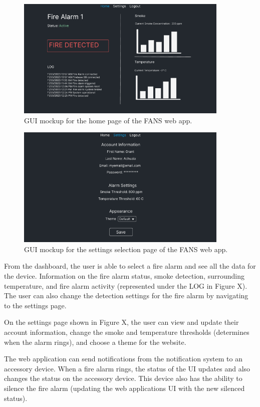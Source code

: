 \begin{figure}[H]
    \centering
    \includegraphics[width=4in]{../assets/HomePage.png}
    \caption{GUI mockup for the home page of the FANS web app.}
\end{figure}

\begin{figure}[H]
    \centering
    \includegraphics[width=4in]{../assets/SettingsPage.png}
    \caption{GUI mockup for the settings selection page of the FANS web app.}
\end{figure}

From the dashboard, the user is able to select a fire alarm and see all the data for the device. Information on the
fire alarm status, smoke detection, surrounding temperature, and fire alarm activity (represented under the LOG in
Figure X). The user can also change the detection settings for the fire alarm by navigating to the settings page.

On the settings page shown in Figure X, the user can view and update their account information, change the smoke and
temperature thresholds (determines when the alarm rings), and choose a theme for the website.

The web application can send notifications from the notification system to an accessory device. When a fire alarm
rings, the status of the UI updates and also changes the status on the accessory device. This device also has the
ability to silence the fire alarm (updating the web applications UI with the new silenced status).

